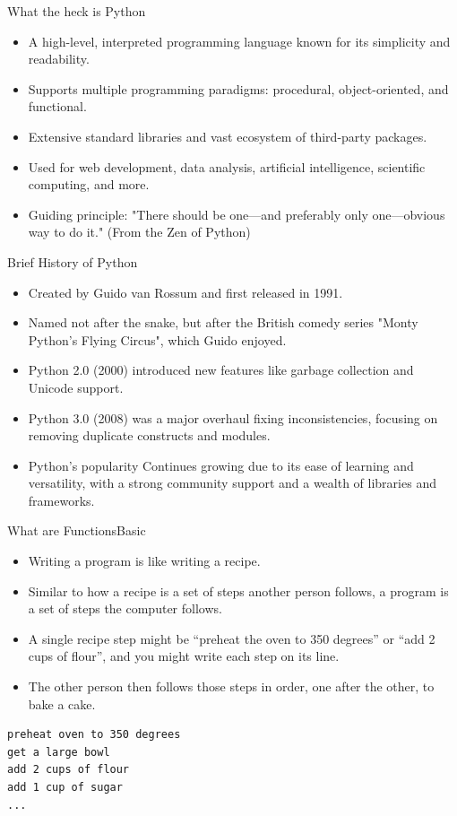 \documentclass[10pt]{beamer}
\begin{document}
\begin{frame}{What the heck is Python}
    \begin{itemize}
	\item A high-level, interpreted programming language known for its simplicity and readability.
	\item Supports multiple programming paradigms: procedural, object-oriented, and functional.
	\item Extensive standard libraries and vast ecosystem of third-party packages.
	\item Used for web development, data analysis, artificial intelligence, scientific computing, and more.
	\item Guiding principle: "There should be one—and preferably only one—obvious way to do it." (From the Zen of Python)
\end{itemize}
\end{frame}


\begin{frame}{Brief History of Python}
    \begin{itemize}
	\item Created by Guido van Rossum and first released in 1991.
	\item Named not after the snake, but after the British comedy series "Monty Python's Flying Circus", which Guido enjoyed.
	\item Python 2.0 (2000) introduced new features like garbage collection and Unicode support.
	\item Python 3.0 (2008) was a major overhaul fixing inconsistencies, focusing on removing duplicate constructs and modules.
	\item Python's popularity Continues growing due to its ease of learning and versatility, with a strong community support and a wealth of libraries and frameworks.
\end{itemize}
\end{frame}

\begin{frame}[fragile]{What are Functions}{Basic}
	\begin{itemize}
		\item Writing a program is like writing a recipe. 
		\item Similar to how a recipe is a set of steps another person follows, a program is a set of steps the computer follows.
		\item A single recipe step might be “preheat the oven to 350 degrees” or “add 2 cups of flour”, and you might write each step on its line. 
		\item The other person then follows those steps in order, one after the other, to bake a cake.
	\end{itemize}
\begin{lstlisting}
preheat oven to 350 degrees
get a large bowl
add 2 cups of flour
add 1 cup of sugar
...
\end{lstlisting}	

\end{frame}
\end{document}

